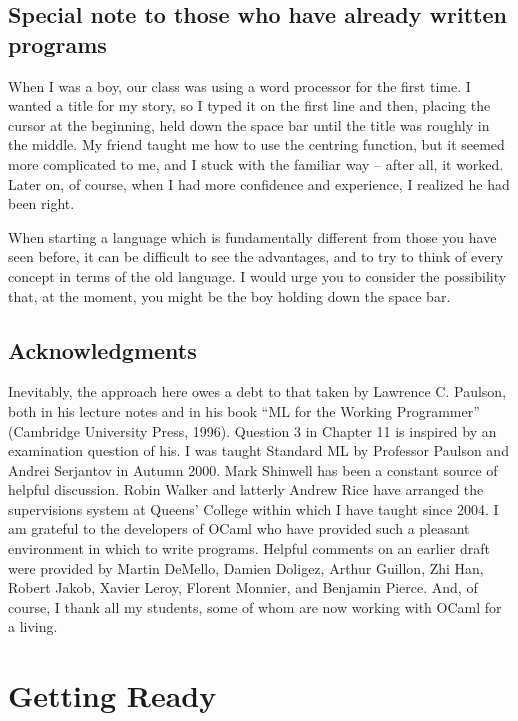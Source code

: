\documentclass[]{book}
\begin{document}
\section*{Special note to those who have already written programs}
When I was a boy, our class was using a word processor for the first time. I wanted a title for my story, so I typed it on the first line and then, placing the cursor at the beginning, held down the space bar until the title was roughly in the middle. My friend taught me how to use the centring function, but it seemed more complicated to me, and I stuck with the familiar way -- after all, it worked. Later on, of course, when I had more confidence and experience, I realized he had been right.

When starting a language which is fundamentally different from those you have seen before, it can be difficult to see the advantages, and to try to think of every concept in terms of the old language. I would urge you to consider the possibility that, at the moment, you might be the boy holding down the space bar.

\section*{Acknowledgments}

Inevitably, the approach here owes a debt to that taken by Lawrence C. Paulson, both in his lecture notes and in his book ``ML for the Working Programmer'' (Cambridge University Press, 1996). Question 3 in Chapter 11 is inspired by an examination question of his. I was taught Standard ML by Professor Paulson and Andrei Serjantov in Autumn 2000. Mark Shinwell has been a constant source of helpful discussion. Robin Walker and latterly Andrew Rice have arranged the supervisions system at Queens' College within which I have taught since 2004. I am grateful to the developers of OCaml who have provided such a pleasant environment in which to write programs. Helpful comments on an earlier draft were provided by Martin DeMello, Damien Doligez, Arthur Guillon, Zhi Han, Robert Jakob, Xavier Leroy, Florent Monnier, and Benjamin Pierce. And, of course, I thank all my students, some of whom are now working with OCaml for a living.

\pagestyle{empty}


\chapter{Getting Ready}
\end{document}
